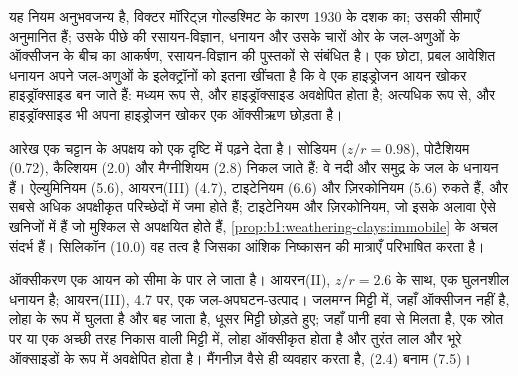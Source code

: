 यह नियम अनुभवजन्य है, विक्टर मॉरिट्ज़ गोल्डश्मिट के कारण 1930 के दशक का; उसकी सीमाएँ अनुमानित हैं; उसके पीछे की रसायन-विज्ञान, धनायन और उसके चारों ओर के जल-अणुओं के ऑक्सीजन के बीच का आकर्षण, रसायन-विज्ञान की पुस्तकों से संबंधित है। एक छोटा, प्रबल आवेशित धनायन अपने जल-अणुओं के इलेक्ट्रॉनों को इतना खींचता है कि वे एक हाइड्रोजन आयन खोकर हाइड्रॉक्साइड बन जाते हैं: मध्यम रूप से, और हाइड्रॉक्साइड अवक्षेपित होता है; अत्यधिक रूप से, और हाइड्रॉक्साइड भी अपना हाइड्रोजन खोकर एक ऑक्सीऋण छोड़ता है।

आरेख एक चट्टान के अपक्षय को एक दृष्टि में पढ़ने देता है। सोडियम ($z/r = 0.98$), पोटैशियम (0.72), कैल्शियम (2.0) और मैग्नीशियम (2.8) निकल जाते हैं: वे नदी और समुद्र के जल के धनायन हैं। ऐल्युमिनियम (5.6), आयरन(III) (4.7), टाइटेनियम (6.6) और ज़िरकोनियम (5.6) रुकते हैं, और सबसे अधिक अपक्षीकृत परिच्छेदों में जमा होते हैं; टाइटेनियम और ज़िरकोनियम, जो इसके अलावा ऐसे खनिजों में हैं जो मुश्किल से अपक्षयित होते हैं, \cref{prop:b1:weathering-clays:immobile} के अचल संदर्भ हैं। सिलिकॉन (10.0) वह तत्व है जिसका आंशिक निष्कासन  की मात्राएँ परिभाषित करता है।

ऑक्सीकरण एक आयन को सीमा के पार ले जाता है। आयरन(II), $z/r = 2.6$ के साथ, एक घुलनशील धनायन है; आयरन(III), 4.7 पर, एक जल-अपघटन-उत्पाद। जलमग्न मिट्टी में, जहाँ ऑक्सीजन नहीं है, लोहा  के रूप में घुलता है और बह जाता है, धूसर मिट्टी छोड़ते हुए; जहाँ पानी हवा से मिलता है, एक स्रोत पर या एक अच्छी तरह निकास वाली मिट्टी में, लोहा ऑक्सीकृत होता है और तुरंत लाल और भूरे ऑक्साइडों के रूप में अवक्षेपित होता है। मैंगनीज़ वैसे ही व्यवहार करता है,  (2.4) बनाम  (7.5)।

